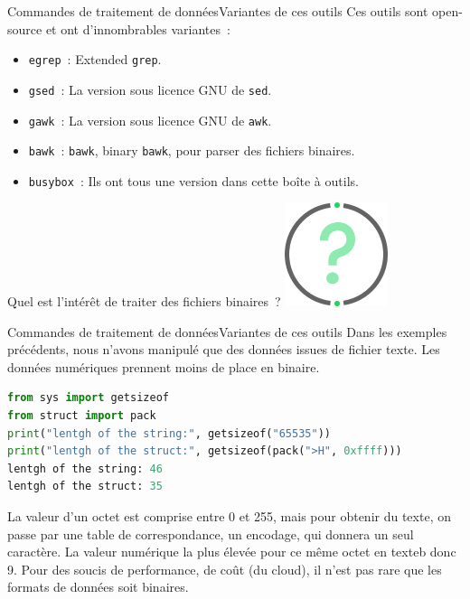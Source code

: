\documentclass{beamer}
\begin{document}
    \begin{frame}{Commandes de traitement de données}{Variantes de ces outils}
        Ces outils sont open-source et ont d'innombrables variantes~:
        \begin{itemize}
            \item \lstinline{egrep}~: Extended \lstinline{grep}.
            \item \lstinline{gsed}~: La version sous licence GNU de \lstinline{sed}.
            \item \lstinline{gawk}~: La version sous licence GNU de \lstinline{awk}.
            \item \lstinline{bawk}~: \lstinline{bawk}, binary \lstinline{bawk}, pour parser des fichiers binaires.
            \item \lstinline{busybox}~: Ils ont tous une version dans cette boîte à outils.
        \end{itemize}
        \bigbreak
        Quel est l'intérêt de traiter des fichiers binaires~?
        \bigbreak
        \centering
        \includegraphics[width=3cm]{image/question-mark}
    \end{frame}

    \begin{frame}[fragile]{Commandes de traitement de données}{Variantes de ces outils}
        Dans les exemples précédents, nous n'avons manipulé que des données issues de fichier texte.
        Les données numériques prennent moins de place en binaire.
        \begin{lstlisting}[language=python]
from sys import getsizeof
from struct import pack
print("lentgh of the string:", getsizeof("65535"))
print("lentgh of the struct:", getsizeof(pack(">H", 0xffff)))
lentgh of the string: 46
lentgh of the struct: 35
        \end{lstlisting}
        La valeur d'un octet est comprise entre 0 et 255, mais pour obtenir du texte, on passe par une table de correspondance, un encodage, qui donnera un seul caractère.
        La valeur numérique la plus élevée pour ce même octet en texteb donc 9.
        \bigbreak
        Pour des soucis de performance, de coût (du cloud), il n'est pas rare que les formats de données soit binaires.
    \end{frame}
\end{document}
